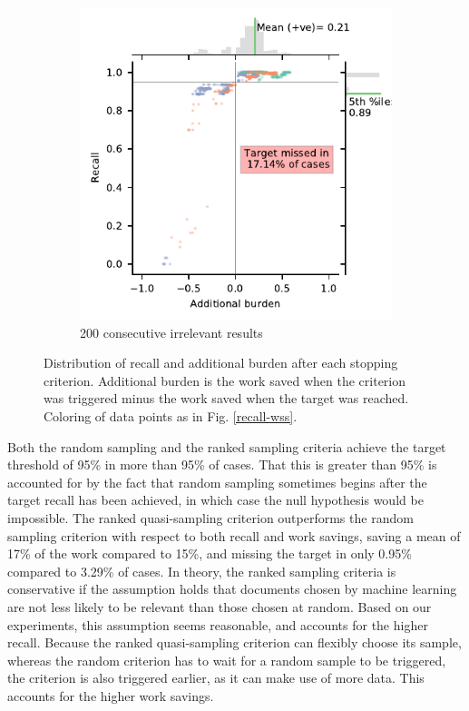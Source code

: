 \documentclass{bmcart}
\begin{document}
\begin{figure}
\begin{subfigure}[b]{0.475\textwidth}
		\end{subfigure}
		\hfill
		\begin{subfigure}[b]{0.475\textwidth}   
			\centering 
			\includegraphics[width=\textwidth]{2_figs_jointplot_burden_ih_200.pdf}
			\caption[]%
			{{\footnotesize 200 consecutive irrelevant results }}    
			\label{fig:ih_100_ab}
		\end{subfigure}
		
		\caption{\small Distribution of recall and additional burden after each stopping criterion. Additional burden is the work saved when the criterion was triggered minus the work saved when the target was reached. Coloring of data points as in Fig. \ref{recall-wss}.}
		\label{recall-burden}
	\end{figure}
	
	
	
	Both the random sampling and the ranked sampling criteria achieve the target threshold of 95\% in more than 95\% of cases. 
	That this is greater than 95\% is accounted for by the fact that random sampling sometimes begins after the target recall has been achieved, in which case the null hypothesis would be  impossible.
	The ranked quasi-sampling criterion  outperforms the random sampling criterion with respect to both recall and work savings, saving a mean of 17\% of the work compared to 15\%, and missing the target in only 0.95\% compared to 3.29\% of cases. In theory, the ranked sampling criteria is conservative if the assumption holds that documents chosen by machine learning are not less likely to be relevant than those chosen at random. Based on our experiments, this assumption seems reasonable, and accounts for the higher recall. Because the ranked quasi-sampling criterion can flexibly choose its sample, whereas the random criterion has to wait for a random sample to be triggered, the criterion is also triggered earlier, as it can make use of more data. This accounts for the higher work savings.
	
\end{document}
